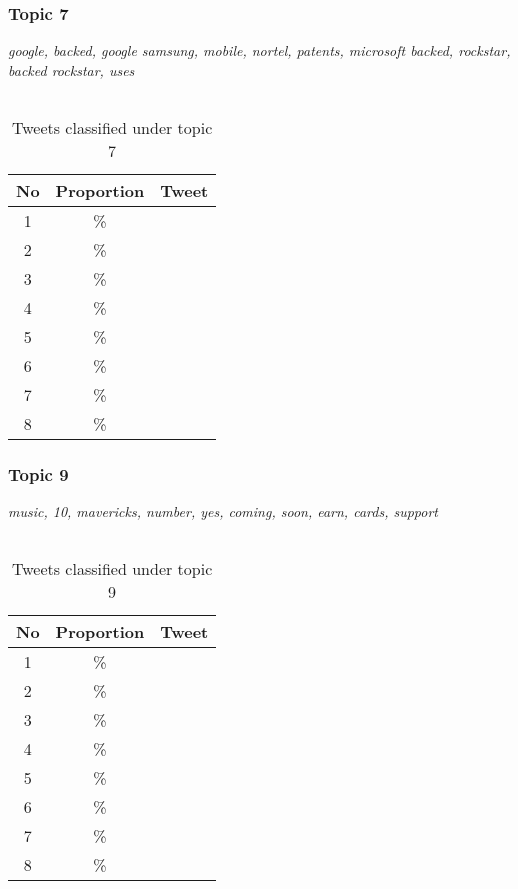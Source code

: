 \subsubsection{Topic 7}
\label{sec:topic_7}
\textit{google, backed, google samsung, mobile, nortel, patents, microsoft backed, rockstar, backed
rockstar, uses } \\\\

\begin{table}[H]
  \begin{tabular}{c c p{13cm}} \toprule
    No & Proportion & Tweet \\ \midrule
    1  & \%       & \\ \midrule
    2  & \%       & \\ \midrule
    3  & \%       & \\ \midrule
    4  & \%       & \\ \midrule
    5  & \%       & \\ \midrule
    6  & \%       & \\ \midrule
    7  & \%       & \\ \midrule
    8  & \%       & \\ \bottomrule
  \end{tabular}
  \caption{Tweets classified under topic 7}
  \label{tab:tweets_under_7}
\end{table}


\subsubsection{Topic 9}
\label{sec:topic_9}
\textit{music, 10, mavericks, number, yes, coming, soon, earn, cards, support}\\\\

\begin{table}[H]
  \begin{tabular}{c c p{13cm}} \toprule
    No & Proportion & Tweet \\ \midrule
    1  & \%       & \\ \midrule
    2  & \%       & \\ \midrule
    3  & \%       & \\ \midrule
    4  & \%       & \\ \midrule
    5  & \%       & \\ \midrule
    6  & \%       & \\ \midrule
    7  & \%       & \\ \midrule
    8  & \%       & \\ \bottomrule
  \end{tabular}
  \caption{Tweets classified under topic 9}
  \label{tab:tweets_under_9}
\end{table}



